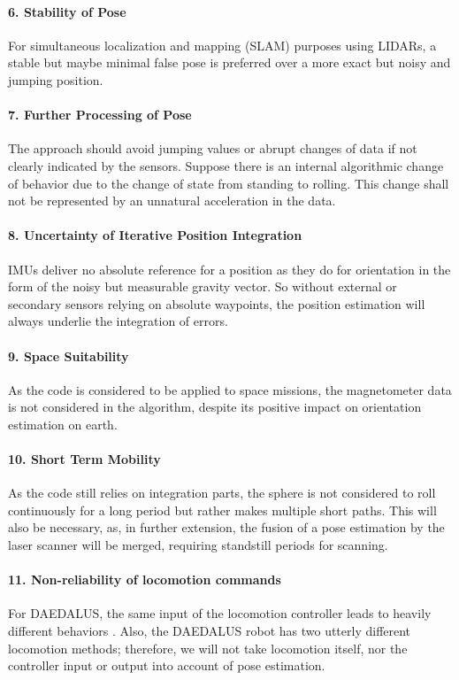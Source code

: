 \documentclass[letterpaper, 10 pt, conference]{ieeeconf}  %
\begin{document}
\paragraph*{6. Stability of Pose}
For simultaneous localization and mapping (SLAM) purposes using LIDARs, a stable but maybe minimal false pose is preferred over a more exact but noisy and jumping position.
\paragraph*{7. Further Processing of Pose}
The approach should avoid jumping values or abrupt changes of data if not clearly indicated by the sensors. Suppose there is an internal algorithmic change of behavior due to the change of state from standing to rolling. This change shall not be represented by an unnatural acceleration in the data.
\paragraph*{8. Uncertainty of Iterative Position Integration}
IMUs deliver no absolute reference for a position as they do for orientation in the form of the noisy but measurable gravity vector. So without external or secondary sensors relying on absolute waypoints, the position estimation will always underlie the integration of errors.
\paragraph*{9. Space Suitability}
As the code is considered to be applied to space missions, the magnetometer data is not considered in the algorithm, despite its positive impact on orientation estimation on earth.
\paragraph*{10. Short Term Mobility}
As the code still relies on integration parts, the sphere is not considered to roll continuously for a long period but rather makes multiple short paths. This will also be necessary, as, in further extension, the fusion of a pose estimation by the laser scanner will be merged, requiring standstill periods for scanning.
\paragraph*{11. Non-reliability of locomotion commands}
For DAEDALUS, the same input of the locomotion controller leads to heavily different behaviors \cite{rossi2021daedalus}.
Also, the DAEDALUS robot has two utterly different locomotion methods; therefore, we will not take locomotion itself, nor the controller input or output into account of pose estimation.
\end{document}
